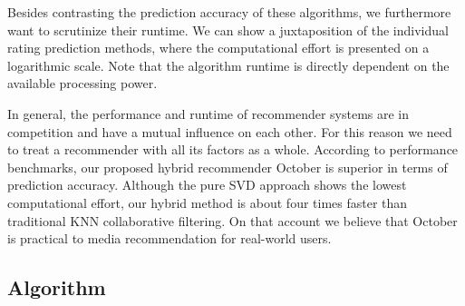 \documentclass[11pt,letterpaper]{article}
\begin{document}
Besides contrasting the prediction accuracy of these algorithms, we furthermore want to scrutinize their runtime. We can show a juxtaposition of the individual rating prediction methods, where the computational effort is presented on a logarithmic scale. Note that the algorithm runtime is directly dependent on the available processing power.

In general, the performance and runtime of recommender systems are in competition and have a mutual influence on each other. For this reason we need to treat a recommender with all its factors as a whole. According to performance benchmarks, our proposed hybrid recommender October is superior in terms of prediction accuracy. Although the pure SVD approach shows the lowest computational effort, our hybrid method is about four times faster than traditional KNN collaborative filtering. On that account we believe that October is practical to media recommendation for real-world users.

\subsection{Algorithm}


\end{document}
